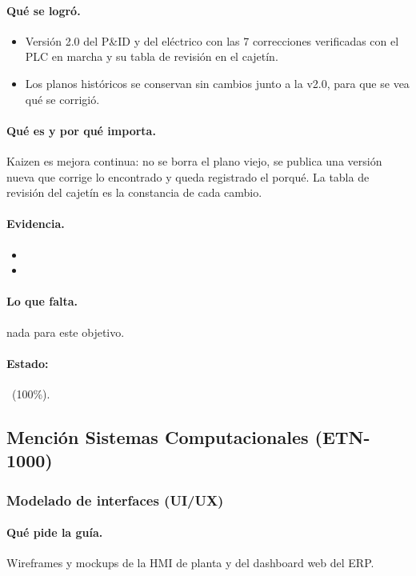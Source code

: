 \documentclass[a4paper,11pt]{article}
\begin{document}
\paragraph{Qué se logró.}
\begin{itemize}
\item Versión 2.0 del P\&ID y del eléctrico con las 7 correcciones verificadas con el PLC en marcha y su tabla de revisión en el cajetín.
\item Los planos históricos se conservan sin cambios junto a la v2.0, para que se vea qué se corrigió.
\end{itemize}
\paragraph{Qué es y por qué importa.} Kaizen es mejora continua: no se borra el plano viejo, se publica una versión nueva que corrige lo encontrado y queda registrado el porqué. La tabla de revisión del cajetín es la constancia de cada cambio.
\paragraph{Evidencia.}
\begin{itemize}\small
\item {}
\item {}
\end{itemize}
\paragraph{Lo que falta.} nada para este objetivo.
\paragraph{Estado:} \cumple~(100\%).
\subsection{Mención Sistemas Computacionales (ETN-1000)}
\subsubsection{Modelado de interfaces (UI/UX)}
\paragraph{Qué pide la guía.} Wireframes y mockups de la HMI de planta y del dashboard web del ERP.
\end{document}
